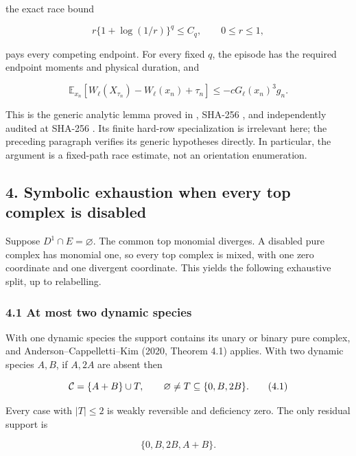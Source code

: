 the exact race bound

\[
             r\{1+\log(1/r)\}^q\le C_q,
             \qquad 0\le r\le1,                           \tag{3.3}
\]

pays every competing endpoint. For every fixed \(q\), the episode has
the required endpoint moments and physical duration, and

\[
 \mathbb E_{x_n}
 [W_\ell(X_{\tau_n})-W_\ell(x_n)+\tau_n]
             \le-cG_\ell(x_n)^3g_n.                        \tag{3.4}
\]

This is the generic analytic lemma proved in
\texttt{}, SHA-256
\texttt{},
and independently audited at SHA-256
\texttt{}.
Its finite hard-row specialization is irrelevant here; the preceding
paragraph verifies its generic hypotheses directly. In particular, the
argument is a fixed-path race estimate, not an orientation enumeration.

\subsection{4. Symbolic exhaustion when every top complex is
disabled}

Suppose \(D^1\cap E=\varnothing\). The common top monomial diverges. A
disabled pure complex has monomial one, so every top complex is mixed,
with one zero coordinate and one divergent coordinate. This yields the
following exhaustive split, up to relabelling.

\subsubsection{4.1 At most two dynamic
species}

With one dynamic species the support contains its unary or binary pure
complex, and Anderson--Cappelletti--Kim (2020, Theorem 4.1) applies.
With two dynamic species \(A,B\), if \(A,2A\) are absent then

\[
              {\cal C}=\{A+B\}\cup T,
              \qquad\varnothing\ne T\subseteq\{0,B,2B\}.  \tag{4.1}
\]

Every case with \(|T|\le2\) is weakly reversible and deficiency zero.
The only residual support is

\[
                        \{0,B,2B,A+B\}.                    \tag{4.2}
\]

